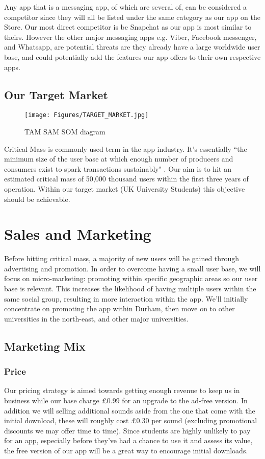 \documentclass[12pt]{article}
\begin{document}
Any app that is a messaging app, of which are several of, can be considered a competitor since they will all be listed under the same category as our app on the Store. Our most direct competitor is be Snapchat as our app is most similar to theirs. However the other major messaging apps e.g. Viber, Facebook messenger, and Whatsapp, are potential threats are they already have a large worldwide user base, and could potentially add the features our app offers to their own respective apps.

\subsection{Our Target Market}

\begin{figure}
    \centering
    \texttt{[image: Figures/TARGET\_MARKET.jpg]}
    \caption{TAM SAM SOM diagram}
    \label{fig:target market}
\end{figure}

Critical Mass is commonly used term in the app industry. It’s essentially “the minimum size of the user base at which enough number of producers and consumers exist to spark transactions sustainably" \cite{Choudaryn.d.}. Our aim is to hit an estimated critical mass of 50,000 thousand users within the first three years of operation. Within our target market (UK University Students) this objective should be achievable. 

\section{Sales and Marketing}
Before hitting critical mass, a majority of new users will be gained through advertising and promotion. In order to overcome having a small user base, we will focus on micro-marketing: promoting within specific geographic areas so our user base is relevant. This increases the likelihood of having multiple users within the same social group, resulting in more interaction within the app. We'll initially concentrate on promoting the app within Durham, then move on to other universities in the north-east, and other major universities.

\subsection{Marketing Mix}

\subsubsection*{Price}
Our pricing strategy is aimed towards getting enough revenue to keep us in business while our base charge £0.99 for an upgrade to the ad-free version. In addition we will selling additional sounds aside from the one that come with the initial download, these will roughly cost £0.30 per sound (excluding promotional discounts we may offer time to time). Since students are highly unlikely to pay for an app, especially before they've had a chance to use it and assess its value, the free version of our app will be a great way to encourage initial downloads.
\end{document}
